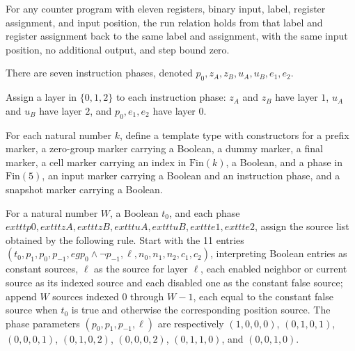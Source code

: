 \begin{theorem}
\label{Complexity.UTab.goes_refl}
\leanok
{}
For any counter program with eleven registers, binary input, label, register assignment,
and input position, the run relation holds from that label and register assignment back
to the same label and assignment, with the same input position, no additional output,
and step bound zero.
\end{theorem}

\begin{definition}
\label{Complexity.UTab.IPh}
\leanok
There are seven instruction phases, denoted $p_0,z_A,z_B,u_A,u_B,e_1,e_2$.
\end{definition}

\begin{definition}
\label{Complexity.UTab.IPh.lay}
\leanok
{}
Assign a layer in $\{0,1,2\}$ to each instruction phase: $z_A$ and $z_B$ have layer $1$,
$u_A$ and $u_B$ have layer $2$, and $p_0,e_1,e_2$ have layer $0$.
\end{definition}

\begin{definition}
\label{Complexity.UTab.Tpl}
\leanok
{}
For each natural number $k$, define a template type with constructors for a prefix
marker, a zero-group marker carrying a Boolean, a dummy marker, a final marker, a cell
marker carrying an index in $\mathrm{Fin}(k)$, a Boolean, and a phase in
$\mathrm{Fin}(5)$, an input marker carrying a Boolean and an instruction phase, and a
snapshot marker carrying a Boolean.
\end{definition}

\begin{definition}
\label{Complexity.UTab.inpPhS}
\leanok
{}
For a natural number $W$, a Boolean $t_0$, and each phase
$	exttt{p0},	exttt{zA},	exttt{zB},	exttt{uA},	exttt{uB},	exttt{e1},	exttt{e2}$, assign
the source list obtained by the following rule. Start with the 11 entries
$(t_0,p_1,p_0,p_{-1},
eg p_0\land\neg p_{-1},\ell,n_0,n_1,n_2,c_1,c_2)$, interpreting Boolean entries as
constant sources, $\ell$ as the source for layer $\ell$, each enabled neighbor or
current source as its indexed source and each disabled one as the constant false source;
append $W$ sources indexed $0$ through $W-1$, each equal to the constant false source
when $t_0$ is true and otherwise the corresponding position source. The phase parameters
$(p_0,p_1,p_{-1},\ell)$ are respectively $(1,0,0,0)$, $(0,1,0,1)$, $(0,0,0,1)$,
$(0,1,0,2)$, $(0,0,0,2)$, $(0,1,1,0)$, and $(0,0,1,0)$.
\end{definition}

